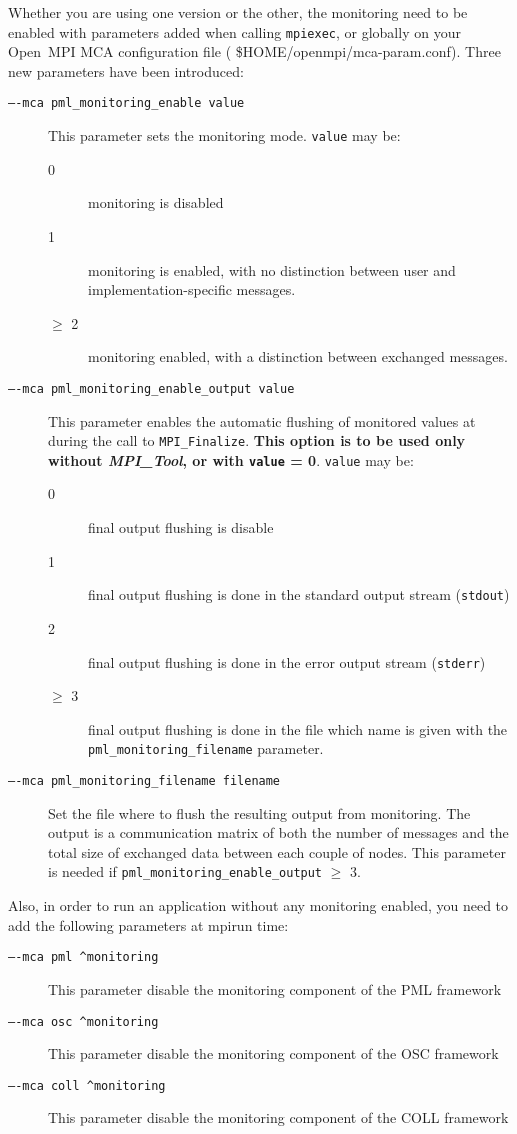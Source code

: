 \documentclass[notitlepage]{article}
\newcommand{\mpit}[1]{\textit{MPI\_Tool#1}}
\begin{document}
Whether you are using one version or the other, the monitoring need to
be enabled with parameters added when calling \texttt{mpiexec}, or globally
on your Open~MPI MCA configuration file ( \${HOME}/openmpi/mca-param.conf).
Three new parameters have been introduced:
\begin{description}
\item [\texttt{----mca pml\_monitoring\_enable value}] This parameter
  sets the monitoring mode. \texttt{value} may be:
  \begin{description}
  \item [0] monitoring is disabled
  \item [1] monitoring is enabled, with no distinction between user and
    implementation-specific messages.
  \item [$\ge$ 2] monitoring enabled, with a distinction between
    exchanged messages.
  \end{description}
\item [\texttt{----mca pml\_monitoring\_enable\_output value}] This
  parameter enables the automatic flushing of monitored values at
  during the call to \texttt{MPI\_Finalize}. {\bf This option is to be
    used only without \mpit{}, or with \texttt{value} =
    0}. \texttt{value} may be:
  \begin{description}
  \item [0] final output flushing is disable
  \item [1] final output flushing is done in the standard output stream (\texttt{stdout})
  \item [2] final output flushing is done in the error output stream (\texttt{stderr})
  \item [$\ge$ 3] final output flushing is done in the file which name
    is given with the \texttt{pml\_monitoring\_filename} parameter.
  \end{description}
\item [\texttt{----mca pml\_monitoring\_filename filename}] Set the
  file where to flush the resulting output from monitoring. The output
  is a communication matrix of both the number of messages and the
  total size of exchanged data between each couple of nodes. This
  parameter is needed if \texttt{pml\_monitoring\_enable\_output}
  $\ge$ 3.
\end{description}

Also, in order to run an application without any monitoring enabled,
you need to add the following parameters at mpirun time:
\begin{description}
\item [\texttt{----mca pml ^monitoring}] This parameter disable the
  monitoring component of the PML framework
\item [\texttt{----mca osc ^monitoring}] This parameter disable the
  monitoring component of the OSC framework
\item [\texttt{----mca coll ^monitoring}] This parameter disable the
    monitoring component of the COLL framework
\end{description}
\end{document}

